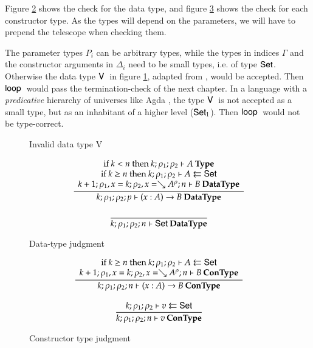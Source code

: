Figure \ref{fdata} shows the check for the data type, and figure \ref{fcon} shows the check for each constructor type.
As the types will depend on the parameters, we will have to prepend the telescope when checking them.

The parameter types $P_i$ can be arbitrary types, while the types in indices $\Gamma$  and the constructor arguments in $\Delta_i$  need to be small types, i.e. of type $\mathsf{Set}$. 
Otherwise the data type $\mathsf{V}\:$ in figure \ref{fv}, adapted from \cite{coquand92pattern}, would be accepted.
Then $\mathsf{loop}\:$ would pass the termination-check of the next chapter. In a language with a \emph{predicative} hierarchy of universes like Agda \cite{norell:thesis}, the type $\mathsf{V}\:$ is not accepted as a small type, but as an inhabitant of a higher level ($\mathsf{Set}_1$). Then $\mathsf{loop}\:$ would not be type-correct.



\begin{figure}[htp]
\caption{Invalid data type V}
\label{fv}
\end{figure}


\begin{figure}[htp]
\begin{gather*}
\ \dfrac{\begin{array}[b]{c}\mbox {if } k < n \mbox{ then } k;\rho_1;\rho_2\vdash A\:\mathbf{Type}\\\mbox {if } k \geq n \mbox { then } k;\rho_1;\rho_2\vdash A\leftleftarrows\mathsf{Set}\\k+1;\rho_1,x=k;\rho_2,x=\searrow A^{\rho};n\vdash B\:\mathbf{DataType}\end{array}}{k;\rho_1;\rho_2;p\vdash( x : A ) \rightarrow{B}\:\mathbf{DataType}}
\\[2ex]
\ \dfrac{}{k;\rho_1;\rho_2;n\vdash\mathsf{Set}\:\mathbf{DataType}}
\end{gather*}
\caption{Data-type judgment}
\label{fdata}
\end{figure}

\begin{figure}[htp]
\begin{gather*}
\ \dfrac{\begin{array}[b]{c}\mbox {if } k \geq n \mbox { then } k;\rho_1;\rho_2\vdash A\leftleftarrows\mathsf{Set}\\k+1;\rho_1,x=k;\rho_2,x=\searrow A^{\rho};n\vdash B\:\mathbf{ConType}\end{array}}{k;\rho_1;\rho_2;n\vdash( x : A ) \rightarrow{B}\:\mathbf{ConType}}
\\[2ex]
\ \dfrac{k;\rho_1;\rho_2\vdash v\leftleftarrows\mathsf{Set}}{k;\rho_1;\rho_2;n\vdash v\:\mathbf{ConType}}
\end{gather*}
\caption{Constructor type judgment}
\label{fcon}
\end{figure}

